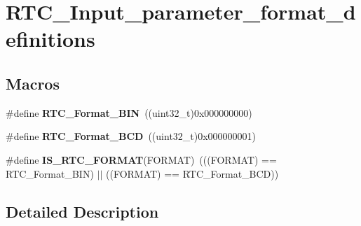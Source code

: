 \hypertarget{group___r_t_c___input__parameter__format__definitions}{}\section{R\+T\+C\+\_\+\+Input\+\_\+parameter\+\_\+format\+\_\+definitions}
\label{group___r_t_c___input__parameter__format__definitions}
\subsection*{Macros}
\begin{DoxyCompactItemize}
\item 
\hypertarget{group___r_t_c___input__parameter__format__definitions_gaa0d76a1ae008c8e3602e45a1d4675174}{}\#define {\bfseries R\+T\+C\+\_\+\+Format\+\_\+\+B\+I\+N}~((uint32\+\_\+t)0x000000000)\label{group___r_t_c___input__parameter__format__definitions_gaa0d76a1ae008c8e3602e45a1d4675174}

\item 
\hypertarget{group___r_t_c___input__parameter__format__definitions_gac40ea19c2fee09cf26beaa29140a771e}{}\#define {\bfseries R\+T\+C\+\_\+\+Format\+\_\+\+B\+C\+D}~((uint32\+\_\+t)0x000000001)\label{group___r_t_c___input__parameter__format__definitions_gac40ea19c2fee09cf26beaa29140a771e}

\item 
\hypertarget{group___r_t_c___input__parameter__format__definitions_ga05a1ca8558058d71322ccf1045b8fb1c}{}\#define {\bfseries I\+S\+\_\+\+R\+T\+C\+\_\+\+F\+O\+R\+M\+A\+T}(F\+O\+R\+M\+A\+T)~(((F\+O\+R\+M\+A\+T) == R\+T\+C\+\_\+\+Format\+\_\+\+B\+I\+N) $\vert$$\vert$ ((F\+O\+R\+M\+A\+T) == R\+T\+C\+\_\+\+Format\+\_\+\+B\+C\+D))\label{group___r_t_c___input__parameter__format__definitions_ga05a1ca8558058d71322ccf1045b8fb1c}

\end{DoxyCompactItemize}


\subsection{Detailed Description}
